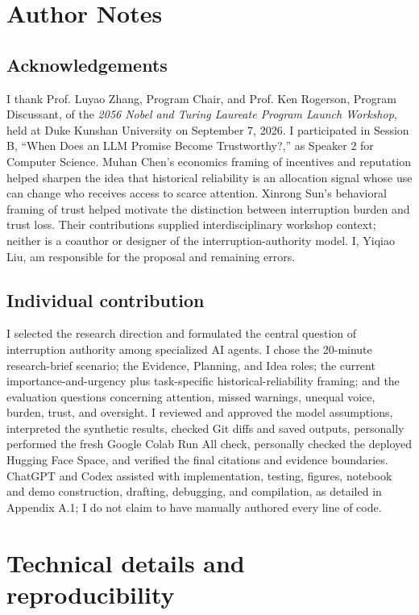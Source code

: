 \clearpage\nobalance
\section*{Author Notes}
\subsection*{Acknowledgements}
I thank Prof. Luyao Zhang, Program Chair, and Prof. Ken Rogerson, Program Discussant, of the \emph{2056 Nobel and Turing Laureate Program Launch Workshop}, held at Duke Kunshan University on September 7, 2026. I participated in Session B, ``When Does an LLM Promise Become Trustworthy?,'' as Speaker 2 for Computer Science. Muhan Chen's economics framing of incentives and reputation helped sharpen the idea that historical reliability is an allocation signal whose use can change who receives access to scarce attention. Xinrong Sun's behavioral framing of trust helped motivate the distinction between interruption burden and trust loss. Their contributions supplied interdisciplinary workshop context; neither is a coauthor or designer of the interruption-authority model. I, Yiqiao Liu, am responsible for the proposal and remaining errors.

\subsection*{Individual contribution}
I selected the research direction and formulated the central question of interruption authority among specialized AI agents. I chose the 20-minute research-brief scenario; the Evidence, Planning, and Idea roles; the current importance-and-urgency plus task-specific historical-reliability framing; and the evaluation questions concerning attention, missed warnings, unequal voice, burden, trust, and oversight. I reviewed and approved the model assumptions, interpreted the synthetic results, checked Git diffs and saved outputs, personally performed the fresh Google Colab Run All check, personally checked the deployed Hugging Face Space, and verified the final citations and evidence boundaries. ChatGPT and Codex assisted with implementation, testing, figures, notebook and demo construction, drafting, debugging, and compilation, as detailed in Appendix A.1; I do not claim to have manually authored every line of code.


\appendix
\section{Technical details and reproducibility}
